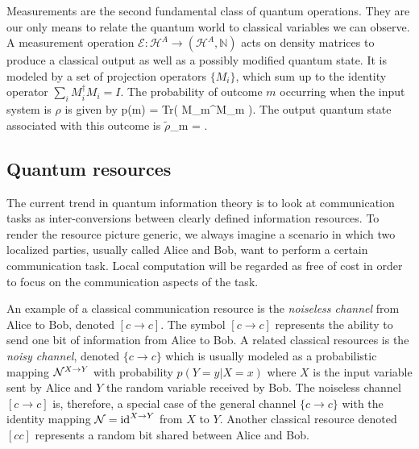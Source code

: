 \documentclass[aps,11pt,twoside,letterpaper]{article}
\def\Tr{\textup{Tr}}
\def\E{\mathcal{E}}
\def\cH{\mathcal{H}}
\def\NN{\mathbb{N}}
\newcommand{\rhot}{{\ensuremath{\tilde{\rho}}}}
\theoremstyle{plain}
\theoremstyle{definition}
\begin{document}
				
			Measurements are the second fundamental class of quantum operations. 
			They are our only means to relate the quantum world to classical variables we can observe.
			A measurement operation $\E\!\!:\!\!\cH^A \to (\cH^A,\NN)$ acts on density matrices to produce a classical
			output as well as a possibly modified quantum state.
			It is modeled by a set of projection operators $\{M_i\}$, which sum up to the identity operator 
			$\sum_i M_i^\dag M_i = I$.
			The probability of outcome $m$ occurring when the input system is $\rho$ is given by
			\be
				p(m)	=	\Tr\!\left( M_m^\dag \rho M_m \right).
			\ee
			The output quantum state associated with this outcome is
			\be
				 \rhot_m	=  \frac{M_m^\dag \rho M_m}{	\Tr\!\left( M_m^\dag \rho M_m \right)	}.
			\ee
			


		\bigskip
		\subsection{Quantum resources}	\label{subsection:quantum-resources}
		
			The current trend in quantum information theory is to look at communication tasks as inter-conversions
			between clearly defined information resources. 
			To render the resource picture generic, we always imagine a scenario in which two localized parties,
			usually called Alice and Bob, want to perform a certain communication task.
			Local computation will be regarded as free of cost in order to focus on the communication aspects 
			of the task. 
			
			An example of a classical communication resource is the \emph{noiseless channel} from 
			Alice to Bob, denoted $[c\to c]$. 
			The symbol $[c \to c]$ represents the ability to send one bit of information from Alice to Bob.
			A related classical resources is the \emph{noisy channel}, denoted $\{c\to c\}$ which is usually 
			modeled as a probabilistic mapping ${\cal N}^{X \to Y}$ with probability $p(Y=y|X=x)$ where
			$X$ is the input variable sent by Alice and $Y$ the random variable received by Bob.
			The noiseless channel $[c\to c]$ is, therefore, a special case of the general channel $\{c\to c\}$ 
			with the identity mapping ${\cal N} = \operatorname{id}^{X \to Y}$ from $X$ to $Y$.
			Another classical resource denoted $[cc]$ represents a random bit shared between Alice and Bob.
			
\end{document}
